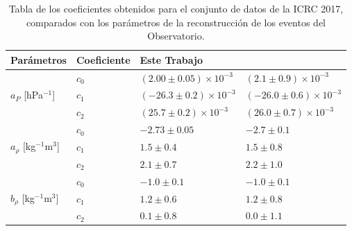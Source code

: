                 \begin{table}[H]
                    \centering
                    \begin{tabular}{l|l|l|l}
                         Parámetros									& Coeficiente		& Este Trabajo			& \cite{aab2017impact}	\\ \hline \hline
                     \multirow{3}{*}{$a_P$ [hPa$^{-1}$]}  			&  $c_0$			& $( 2.00\pm 0.05)\times 10^{-3}$	& $( 2.1 \pm 0.9)\times 10^{-3} $	\\ \cline{2-4} %
                                                                    &  $c_1$			& $(-26.3 \pm 0.2)\times 10^{-3}$	& $(-26.0 \pm 0.6 )\times 10^{-3}$	\\ \cline{2-4} 
                                                                    &  $c_2$			& $( 25.7 \pm 0.2)\times 10^{-3}$	& $( 26.0 \pm 0.7 )\times 10^{-3}$	\\ \hline \hline%
                    
                     \multirow{3}{*}{$a_\rho$ [kg$^{-1}$m$^3$]}  	&  $c_0$			& $-2.73   \pm 0.05$	& $ -2.7  \pm 0.1  $\\ \cline{2-4} 
                                                                    &  $c_1$			& $ 1.5    \pm 0.4 $	& $ 1.5   \pm 0.8  $\\ \cline{2-4} 
                                                                    &  $c_2$			& $ 2.1    \pm 0.7 $	& $ 2.2   \pm 1.0  $\\ \hline \hline%
                    
                    \multirow{3}{*}{$b_\rho$ [kg$^{-1}$m$^3$]} 		&  $c_0$			& $-1.0    \pm 0.1$		& $-1.0   \pm 0.1 $	\\ \cline{2-4} 
                                                                    &  $c_1$			& $ 1.2    \pm 0.6$		& $ 1.2   \pm 0.8  $	\\ \cline{2-4} 
                                                                    &  $c_2$			& $ 0.1    \pm 0.8$		& $ 0.0   \pm 1.1  $	\\ 
                    
                    \end{tabular}	
                    \caption{Tabla de los coeficientes obtenidos para el conjunto de datos de la ICRC 2017, comparados con los parámetros de la reconstrucción de los eventos del Observatorio.} \label{tabla:cuadratica_ICRC_2017}
                \end{table}


